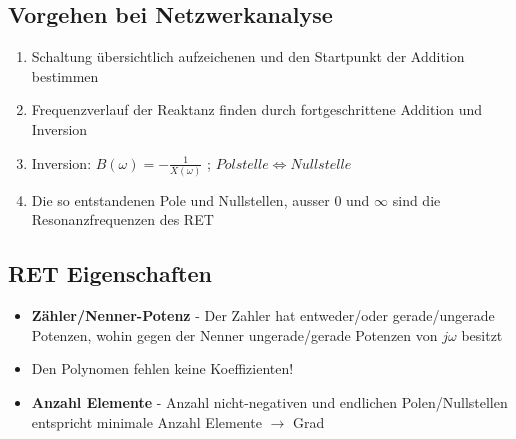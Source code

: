 \begin{multicols}{2}
	
\subsection{Vorgehen bei Netzwerkanalyse}
	\begin{enumerate}{\setlength{\itemsep}{0cm}\setlength{\parsep}{0cm} \setlength{\topsep}{0cm}}
      \item Schaltung übersichtlich aufzeichenen und den Startpunkt der Addition bestimmen
      \item Frequenzverlauf der Reaktanz finden durch fortgeschrittene Addition und Inversion
      \item Inversion: $B(\omega)=-\frac{1}{X(\omega)}$ ; $Polstelle \Longleftrightarrow Nullstelle$
      \item Die so entstandenen Pole und Nullstellen, ausser 0 und $\infty$ sind die Resonanzfrequenzen des RET
    \end{enumerate}
    
    
\subsection{RET Eigenschaften}
	\begin{itemize}
		\item \textbf{Zähler/Nenner-Potenz} - Der Zahler hat entweder/oder gerade/ungerade Potenzen, wohin gegen der Nenner ungerade/gerade Potenzen von $j\omega$ besitzt
		\item Den Polynomen fehlen keine Koeffizienten!
		\item \textbf{Anzahl Elemente} - Anzahl nicht-negativen und endlichen Polen/Nullstellen entspricht minimale Anzahl Elemente $\rightarrow$ Grad
	\end{itemize}
	
\end{multicols}	

